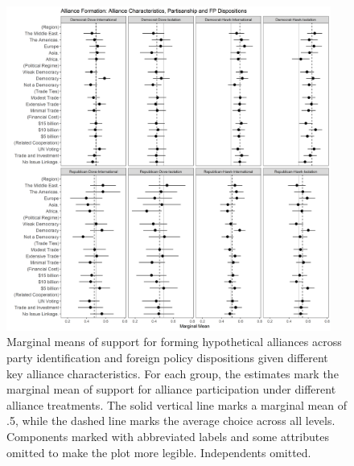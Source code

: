 \documentclass[12pt]{article}
\begin{document}
\begin{figure}[htpb]
	\centering
		\includegraphics[width=0.95\textwidth]{party-dispo-form-char.png}
	\caption{Marginal means of support for forming hypothetical alliances across party identification and foreign policy dispositions given different key alliance characteristics. For each group, the estimates mark the marginal mean of support for alliance participation under different alliance treatments. The solid vertical line marks a marginal mean of .5, while the dashed line marks the average choice across all levels. Components marked with abbreviated labels and some attributes omitted to make the plot more legible. Independents omitted.}
	\label{fig:party-dispo-form-char}
\end{figure}
\end{document}
